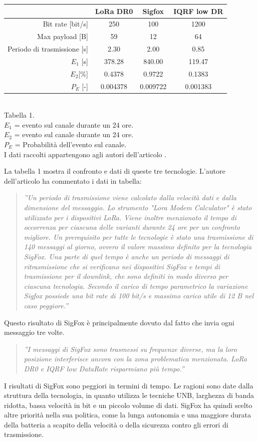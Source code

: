 \documentclass[a4paper]{report} %
\begin{document}
\begin{center}
	\begin{tabular}{|r|c|c|c|}
		&LoRa DR0&Sigfox&IQRF low DR\\ \hline
		Bit rate [bit/s]&250&100&1200\\ \hline
		Max payload [B]&59&12&64\\ \hline
		Periodo di trasmissione [s]&2.30&2.00&0.85\\ \hline
		$E_1$ [s]&378.28&840.00&119.47\\ \hline
		$E_2$[\%]&0.4378&0.9722&0.1383\\ \hline
		$P_E$ [-]&0.004378&0.009722&0.001383\\ \hline
	\end{tabular}
	\\ 
	Tabella 1. \\
	$E_1$ = evento sul canale durante un 24 ore. \\
	$E_2$ = evento sul canale durante un 24 ore. \\
	$P_E$ = Probabilità dell'evento sul canale. \\
	I dati raccolti appartengono agli autori dell'articolo \cite{art:rif.46}. \\
	
\end{center}
La tabella 1 mostra il confronto e dati di queste tre tecnologie. L'autore dell'articolo \cite{art:rif.46} ha commentato i dati in tabella:
\begin{quote}
	\textit{''Un periodo di trasmissione viene calcolato dalla velocità dati e dalla dimensione del messaggio. Lo strumento "Lora Modem Calculator" è stato utilizzato per i dispositivi LoRa. Viene inoltre menzionato il tempo di occorrenza per ciascuna delle varianti durante 24 ore per un confronto migliore. Un prerequisito per tutte le tecnologie è stato una trasmissione di 140 messaggi al giorno, ovvero il valore massimo definito per la tecnologia SigFox. Una parte di quel tempo è anche un periodo di messaggi di ritrasmissione che si verificano nei dispositivi SigFox e tempi di trasmissione per il downlink, che sono definiti in modo diverso per ciascuna tecnologia. Secondo il carico di tempo parametrico la variazione Sigfox possiede una bit rate di 100 bit/s e massimo carico utile di 12 B nel caso peggiore.''}
\end{quote}
Questo risultato di SigFox è principalmente dovuto dal fatto che invia ogni messaggio tre volte. 
\begin{quote}
	\textit{''I messaggi di SigFox sono trasmessi su frequenze diverse, ma la loro posizione interferisce ancora con la zona problematica menzionata. LoRa DR0 e IQRF low DataRate risparmiano più tempo.''}
\end{quote}
I risultati di SigFox sono peggiori in termini di tempo. Le ragioni sono date dalla struttura della tecnologia, in quanto utilizza le tecniche UNB, larghezza di banda ridotta, bassa velocità in bit e un piccolo volume di dati. SigFox ha quindi scelto altre priorità nella sua politica, come la lunga autonomia e una maggiore durata della batteria a scapito della velocità o della sicurezza contro gli errori di trasmissione.
\end{document}
